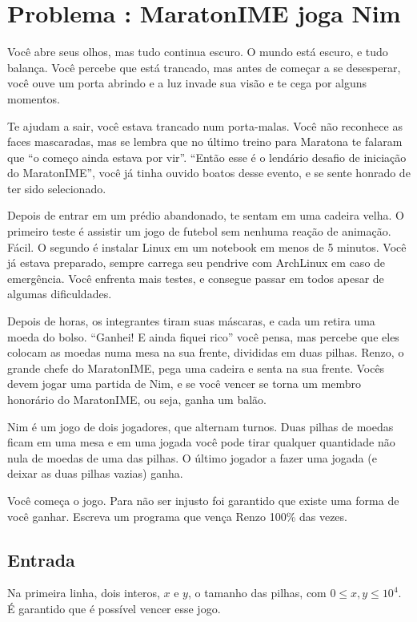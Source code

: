 \section*{Problema \proxLetra: MaratonIME joga Nim}

Você abre seus olhos, mas tudo continua escuro. O mundo está escuro, e tudo balança. Você percebe que está trancado, mas antes de começar a se desesperar, você ouve um porta abrindo e a luz invade sua visão e te cega por alguns momentos.

Te ajudam a sair, você estava trancado num porta-malas. Você não reconhece as faces mascaradas, mas se lembra que no último treino para Maratona te falaram que ``o começo ainda estava por vir''. ``Então esse é o lendário desafio de iniciação do MaratonIME'', você já tinha ouvido boatos desse evento, e se sente honrado de ter sido selecionado.

Depois de entrar em um prédio abandonado, te sentam em uma cadeira velha. O primeiro teste é assistir um jogo de futebol sem nenhuma reação de animação. Fácil. O segundo é instalar Linux em um notebook em menos de 5 minutos. Você já estava preparado, sempre carrega seu pendrive com ArchLinux em caso de emergência. Você enfrenta mais testes, e consegue passar em todos apesar de algumas dificuldades.

Depois de horas, os integrantes tiram suas máscaras, e cada um retira uma moeda do bolso. ``Ganhei! E ainda fiquei rico'' você pensa, mas percebe que eles colocam as moedas numa mesa na sua frente, divididas em duas pilhas. Renzo, o grande chefe do MaratonIME, pega uma cadeira e senta na sua frente. Vocês devem jogar uma partida de Nim, e se você vencer se torna um membro honorário do MaratonIME, ou seja, ganha um balão.

Nim é um jogo de dois jogadores, que alternam turnos. Duas pilhas de moedas ficam em uma mesa e em uma jogada você pode tirar qualquer quantidade não nula de moedas de uma das pilhas. O último jogador a fazer uma jogada (e deixar as duas pilhas vazias) ganha.

Você começa o jogo. Para não ser injusto foi garantido que existe uma forma de você ganhar. Escreva um programa que vença Renzo 100\% das vezes.


\subsection*{Entrada}

Na primeira linha, dois interos, $x$ e $y$, o tamanho das pilhas, com $0 \leq x, y \leq 10^4$. É garantido que é possível vencer esse jogo.

